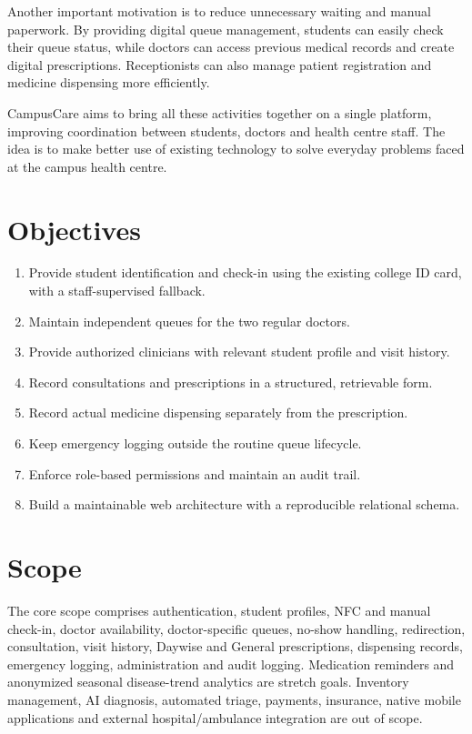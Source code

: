 \documentclass[a4paper,oneside,openany]{tietreport}
\begin{document}
Another important motivation is to reduce unnecessary waiting
and manual paperwork. By providing digital queue management,
students can easily check their queue status, while doctors
can access previous medical records and create digital
prescriptions. Receptionists can also manage patient
registration and medicine dispensing more efficiently.

CampusCare aims to bring all these activities together on a
single platform, improving coordination between students,
doctors and health centre staff. The idea is to make better
use of existing technology to solve everyday problems faced
at the campus health centre.
\section{Objectives}
\begin{enumerate}
\item Provide student identification and check-in using the existing college ID card, with a staff-supervised fallback.
\item Maintain independent queues for the two regular doctors.
\item Provide authorized clinicians with relevant student profile and visit history.
\item Record consultations and prescriptions in a structured, retrievable form.
\item Record actual medicine dispensing separately from the prescription.
\item Keep emergency logging outside the routine queue lifecycle.
\item Enforce role-based permissions and maintain an audit trail.
\item Build a maintainable web architecture with a reproducible relational schema.
\end{enumerate}

\section{Scope}
The core scope comprises authentication, student profiles, NFC and manual check-in, doctor availability, doctor-specific queues, no-show handling, redirection, consultation, visit history, Daywise and General prescriptions, dispensing records, emergency logging, administration and audit logging. Medication reminders and anonymized seasonal disease-trend analytics are stretch goals. Inventory management, AI diagnosis, automated triage, payments, insurance, native mobile applications and external hospital/ambulance integration are out of scope.
\end{document}
